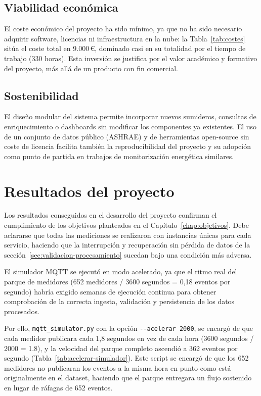 \subsection{Viabilidad económica}

El coste económico del proyecto ha sido mínimo, ya que no ha sido necesario adquirir software, licencias ni infraestructura en la nube: la Tabla~\ref{tab:costes} sitúa el coste total en 9.000\,€, dominado casi en su totalidad por el tiempo de trabajo (330 horas). Esta inversión se justifica por el valor académico y formativo del proyecto, más allá de un producto con fin comercial.

\subsection{Sostenibilidad}

El diseño modular del sistema permite incorporar nuevos sumideros, consultas de enriquecimiento o dashboards sin modificar los componentes ya existentes. El uso de un conjunto de datos público (ASHRAE) y de herramientas open-source sin coste de licencia facilita también la reproducibilidad del proyecto y su adopción como punto de partida en trabajos de monitorización energética similares.

\section{Resultados del proyecto}
\label{chap:resultados}

Los resultados conseguidos en el desarrollo del proyecto confirman el cumplimiento de los objetivos planteados en el Capítulo~\ref{chap:objetivos}. Debe aclararse que todas las mediciones se realizaron con instancias únicas para cada servicio, haciendo que la interrupción y recuperación sin pérdida de datos de la sección~\ref{sec:validacion-procesamiento} sucedan bajo una condición más adversa.

El simulador MQTT se ejecutó en modo acelerado, ya que el ritmo real del parque de medidores (652 medidores / 3600 segundos = 0,18 eventos por segundo) habría exigido semanas de ejecución continua para obtener comprobación de la correcta ingesta, validación y persistencia de los datos procesados.

Por ello, \texttt{mqtt\_simulator.py} con la opción \texttt{-{}-acelerar 2000}, se encargó de que cada medidor publicara cada 1,8 segundos en vez de cada hora (3600 segundos / 2000 = 1.8), y la velocidad del parque completo ascendió a 362 eventos por segundo (Tabla~\ref{tab:acelerar-simulador}). Este script se encargó de que los 652 medidores no publicaran los eventos a la misma hora en punto como está originalmente en el dataset, haciendo que el parque entregara un flujo sostenido en lugar de ráfagas de 652 eventos.

